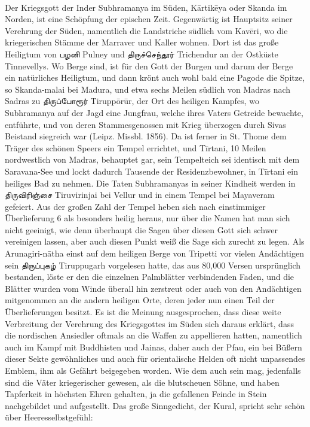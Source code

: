 \documentclass{article}
\newcommand{\TamilText}[1]{\texttamil{#1}}
\newcommand{\tam}[1]{\TamilText{#1}}
\begin{document}
\begin{center}
\end{center}
\paragraph{}
Der Kriegsgott der Inder Subhramanya im Süden, K\={a}rtik\={e}ya oder Skanda im Norden, ist eine Schöpfung der epischen Zeit. Gegenwärtig ist Hauptsitz seiner Verehrung der Süden, namentlich die Landstriche südlich vom Kav\={e}ri, wo die kriegerischen Stämme der Marraver und Kaller wohnen. Dort ist das große Heiligtum von \tam{பழனி} Pulney und \tam{திருச்செந்தூர்} Trichendur an der Ostküste Tinnevellys. Wo Berge sind, ist für den Gott der Burgen und darum der Berge ein natürliches Heiligtum, und dann krönt auch wohl bald eine Pagode die Spitze, so Skanda-malai bei Madura, und etwa sechs Meilen südlich von Madras nach Sadras zu \tam{திருப்போரூர்} Tirupp\={o}r\={u}r, der Ort des heiligen Kampfes, wo Subhramanya auf der Jagd eine Jungfrau, welche ihres Vaters Getreide bewachte, entführte, und von deren Stammesgenossen mit Krieg überzogen durch Sivas Beistand siegreich war (Leipz. Missbl. 1856). Da ist ferner in St. Thome dem Träger des schönen Speers ein Tempel errichtet, und T\={i}rtani, 10 Meilen nordwestlich von Madras, behauptet gar, sein Tempelteich sei identisch mit dem Saravana-See und lockt dadurch Tausende der Residenzbewohner, in T\={i}rtani ein heiliges Bad zu nehmen. Die Taten Subhramanyas in seiner Kindheit werden in \tam{திருவிரிஞ்சை} Tiruvirinjai bei Vellur und in einem Tempel bei Mayaveram gefeiert. Aus der großen Zahl der Tempel heben sich nach einstimmiger Überlieferung 6 als besonders heilig heraus, nur über die Namen hat man sich nicht geeinigt, wie denn überhaupt die Sagen über diesen Gott sich schwer vereinigen lassen, aber auch diesen Punkt weiß die Sage sich zurecht zu legen. Als Arunagiri-n\={a}tha einst auf dem heiligen Berge von Tripetti vor vielen Andächtigen sein \tam{திருப்புகழ்} Tiruppugarh vorgelesen hatte, das aus 80,000 Versen ursprünglich bestanden, löste er den die einzelnen Palmblätter verbindenden Faden, und die Blätter wurden vom Winde überall hin zerstreut oder auch von den Andächtigen mitgenommen an die andern heiligen Orte, deren jeder nun einen Teil der Überlieferungen besitzt. Es ist die Meinung ausgesprochen, dass diese weite Verbreitung der Verehrung des Kriegsgottes im Süden sich daraus erklärt, dass die nordischen Ansiedler oftmals an die Waffen zu appellieren hatten, namentlich auch im Kampf mit Buddhisten und Jainas, daher auch der Pfau, ein bei Büßern dieser Sekte gewöhnliches und auch für orientalische Helden oft nicht unpassendes Emblem, ihm als Gefährt beigegeben worden. Wie dem auch sein mag, jedenfalls sind die Väter kriegerischer gewesen, als die blutscheuen Söhne, und haben Tapferkeit in höchsten Ehren gehalten, ja die gefallenen Feinde in Stein nachgebildet und aufgestellt. Das große Sinngedicht, der Kural, spricht sehr schön über Heeresselbstgefühl:
\end{document}
